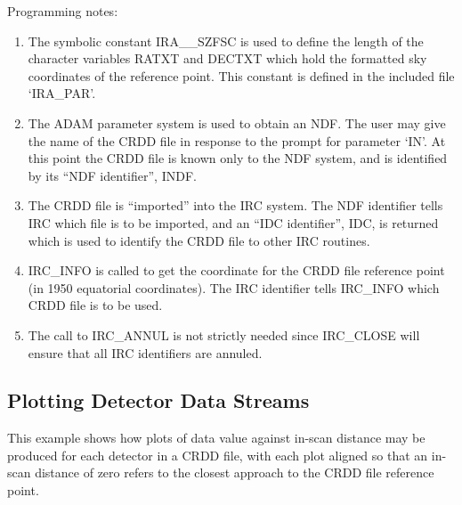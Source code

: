 Programming notes:

\begin{enumerate}

\item The symbolic constant IRA\_\_SZFSC is used to define the length of the
character variables RATXT and DECTXT which hold the formatted sky coordinates of
the reference point. This constant is defined in the included file `IRA\_PAR'.

\item The ADAM parameter system is used to obtain an NDF. The user may give the
name of the CRDD file in response to the prompt for parameter `IN'. At this
point the CRDD file is known only to the NDF system, and is identified by its
``NDF identifier'', INDF.

\item The CRDD file is ``imported'' into the IRC system. The NDF identifier
tells IRC which file is to be imported, and an ``IDC identifier'', IDC, is
returned which is used to identify the CRDD file to other IRC routines.

\item IRC\_INFO is called to get the coordinate for the CRDD file reference
point (in 1950 equatorial coordinates). The IRC identifier tells IRC\_INFO which
CRDD file is to be used.

\item The call to IRC\_ANNUL is not strictly needed since IRC\_CLOSE will
ensure that all IRC identifiers are annuled.

\end{enumerate}

\subsection {Plotting Detector Data Streams}
This example shows how plots of data value against in-scan distance may
be produced for each detector in a CRDD file, with each plot aligned so that
an in-scan distance of zero refers to the closest approach to the CRDD file
reference point.

